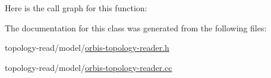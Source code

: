 Here is the call graph for this function\+:




The documentation for this class was generated from the following files\+:\begin{DoxyCompactItemize}
\item 
topology-\/read/model/\hyperlink{orbis-topology-reader_8h}{orbis-\/topology-\/reader.\+h}\item 
topology-\/read/model/\hyperlink{orbis-topology-reader_8cc}{orbis-\/topology-\/reader.\+cc}\end{DoxyCompactItemize}
